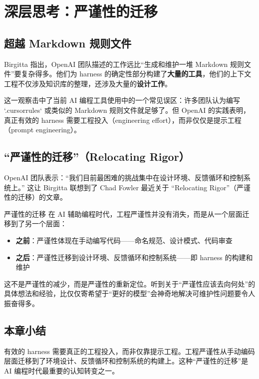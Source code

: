 \section{深层思考：严谨性的迁移}

\subsection{超越 Markdown 规则文件}

Birgitta 指出，OpenAI 团队描述的工作远比``生成和维护一堆 Markdown 规则文件''要复杂得多。他们为 harness 的确定性部分构建了\textbf{大量的工具}，他们的上下文工程不仅涉及知识库的整理，还涉及大量的\textbf{设计工作}。

这一观察击中了当前 AI 编程工具使用中的一个常见误区：许多团队认为编写 `.cursorrules` 或类似的 Markdown 规则文件就足够了。但 OpenAI 的实践表明，真正有效的 harness 需要工程投入（engineering effort），而非仅仅是提示工程（prompt engineering）。

\subsection{``严谨性的迁移''（Relocating Rigor）}

OpenAI 团队表示：``我们目前最困难的挑战集中在设计环境、反馈循环和控制系统上。'' 这让 Birgitta 联想到了 Chad Fowler 最近关于 ``Relocating Rigor''（严谨性的迁移）的文章。

\begin{importantbox}{严谨性的迁移}
在 AI 辅助编程时代，工程严谨性并没有消失，而是从一个层面迁移到了另一个层面：
\begin{itemize}[leftmargin=1.5em]
    \item \textbf{之前}：严谨性体现在手动编写代码------命名规范、设计模式、代码审查
    \item \textbf{之后}：严谨性迁移到设计环境、反馈循环和控制系统------即 harness 的构建和维护
\end{itemize}
这不是严谨性的减少，而是严谨性的重新定位。听到关于``严谨性应该去向何处''的具体想法和经验，比仅仅寄希望于``更好的模型''会神奇地解决可维护性问题要令人振奋得多。
\end{importantbox}

\subsection{本章小结}

有效的 harness 需要真正的工程投入，而非仅靠提示工程。工程严谨性从手动编码层面迁移到了环境设计、反馈循环和控制系统的构建上。这种``严谨性的迁移''是 AI 编程时代最重要的认知转变之一。

\newpage

